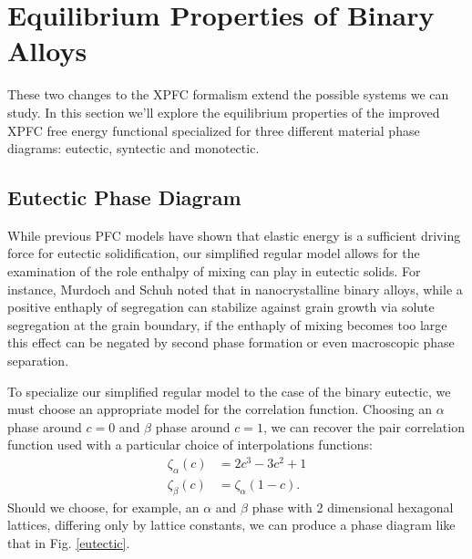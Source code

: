 \section{Equilibrium Properties of Binary Alloys} %

These two changes to the XPFC formalism extend the possible systems we can
study. In this section we'll explore the equilibrium properties of the improved
XPFC free energy functional specialized for three different material phase
diagrams: eutectic, syntectic and monotectic.

\subsection{Eutectic Phase Diagram} %

While previous PFC models have shown that elastic energy is a sufficient
driving force for eutectic solidification, our simplified regular  model allows
for the examination of the role enthalpy of mixing can play in eutectic solids.
For instance, Murdoch and Schuh noted that in nanocrystalline binary alloys,
while a positive enthaply of segregation can stabilize against grain growth via
solute segregation at the grain boundary, if the enthaply of mixing becomes too
large this effect can be negated by second phase formation or even macroscopic
phase separation\cite{MURDOCH13}. 

To specialize our simplified regular model to the case of the binary eutectic,
we must choose an appropriate model for the correlation function. Choosing an
$\alpha$ phase around $c = 0$ and $\beta$ phase around $c = 1$, we can recover
the pair correlation function used  with a
particular choice of interpolations functions: 
%
\begin{align}
   \zeta_\alpha(c) &= 2c^3 - 3c^2 + 1 \\
   \zeta_\beta(c) &= \zeta_\alpha(1 - c).
\end{align}
%
Should we choose, for example, an $\alpha$ and $\beta$ phase with 2 dimensional
hexagonal lattices, differing only by lattice constants, we can produce a phase
diagram like that in Fig. \ref{eutectic}.  

